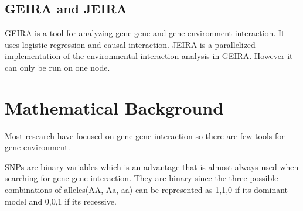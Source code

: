 \documentclass[10pt,a4paper]{article}
\begin{document}
\subsection{GEIRA and JEIRA}
GEIRA is a tool for analyzing gene-gene and gene-environment interaction. It uses logistic regression and causal interaction\cite{geira}. JEIRA is a parallelized implementation of the environmental interaction analysis in GEIRA. However it can only be run on one node.

\clearpage
\section{Mathematical Background}
Most research have focused on gene-gene interaction so there are few tools for gene-environment.

SNPs are binary variables which is an advantage that is almost always used when searching for gene-gene interaction. They are binary since the three possible combinations of alleles(AA, Aa, aa)  can be represented as 1,1,0 if its dominant model and 0,0,1 if its recessive\cite{}. 
\end{document}
